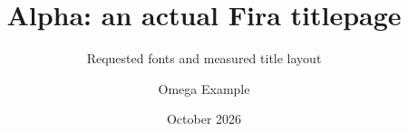 \documentclass[11pt,aspectratio=169]{beamer}
\title{Alpha: an actual Fira titlepage}
\subtitle{Requested fonts and measured title layout}
\author{Omega Example}
\institute{Example Institute}
\date{October 2026}
\begin{document}
\begin{frame}[plain]\titlepage\end{frame}
\end{document}
